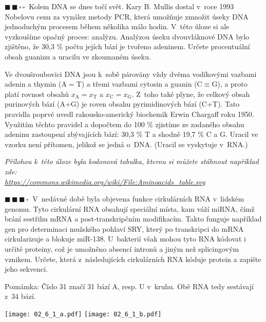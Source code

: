 \documentclass{book}
\newcommand{\dva}{$\blacksquare \, \blacksquare \, \square \, \square \; \; $}
\newcommand{\tri}{$\blacksquare \, \blacksquare \, \blacksquare \, \square \; \; $}
\renewenvironment{quotation}{\par}{\par} %
\begin{document}
\begin{quotation}
\dva Kolem DNA se dnes točí svět. Kary B. Mullis dostal v~roce 1993 Nobelovu
cenu za vynález metody PCR, která umožňuje zmnožit úseky DNA jednoduchým
procesem během několika málo hodin. V~této úloze si ale vyzkoušíme
opačný proces: analýzu. Analýzou úseku dvouvláknové DNA bylo zjištěno,
že 30,3 \% počtu jejích bází je tvořeno adeninem. Určete procentuální
obsah guaninu a uracilu ve zkoumaném úseku.
\end{quotation} \dotfill \par 
Ve dvoušroubovici DNA jsou k~sobě párovány vždy dvěma vodíkovými vazbami
adenin a thymin (A$=$T) a třemi vazbami cytosin a guanin (C$\equiv$G),
a proto platí rovnost obsahů $x_\mathrm{A} = x_\mathrm{T}$ a $x_\mathrm{C} = x_\mathrm{G}$. Z~toho také
plyne, že celkový obsah purinových bází (A+G) je roven obsahu pyrimidinových
bází (C+T). Tato pravidla poprvé uvedl rakousko-americký biochemik
Erwin Chargaff roku 1950. Využitím těchto pravidel a dopočtem do 100
\% zjistíme ze zadaného obsahu adeninu zastoupení zbývajících bází:
30,3 \% T a shodně 19,7 \% C a G. Uracil ve vzorku není přítomen,
jelikož se jedná o~DNA. (Uracil se vyskytuje v~RNA.) 

\hrulefill %
\begin{quotation}
\textit{Přílohou k~této úloze byla kodonová tabulka, kterou si můžete stáhnout například zde:\\ \url{https://commons.wikimedia.org/wiki/File:Aminoacids_table.svg}}

\tri V~nedávné době byla objevena funkce cirkulárních RNA v~lidském genomu.
Tyto cirkulární RNA obsahují speciální místa, kam váží miRNA, čímž
brání sestřihu mRNA a post-transkripčním modifikacím. Takto funguje
například gen pro determinaci mužského pohlaví SRY, který po transkripci
do mRNA cirkularizuje a blokuje miR-138. U~bakterií však mohou tyto
RNA kódovat i určité proteiny, což je umožněno absencí intronů a jiným
než splicingovým vznikem. Určete, která z~následujících cirkulárních
RNA kóduje protein a zapište jeho sekvenci. 

Poznámka: Číslo 31 značí 31 bází A, resp. U v~kruhu. Obě RNA tedy sestávají
z~34 bází.
\end{quotation} \dotfill \par 
\begin{center}
\texttt{[image: 02\_6\_1\_a.pdf]}\hspace{2cm}
\texttt{[image: 02\_6\_1\_b.pdf]}
\end{center}
\end{document}
